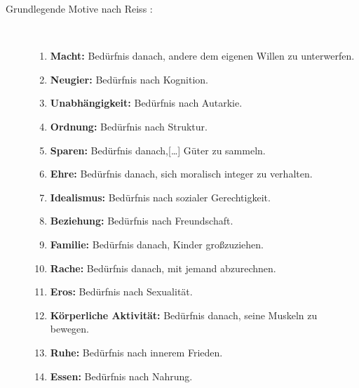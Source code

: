 \documentclass[a4paper,12pt,twoside]{scrartcl}
\begin{document}
\begin{description}
   \item[Grundlegende Motive nach Reiss \cite{Reiss2009}:]~\par
   \begin{enumerate}
      \item \textbf{Macht:} Bedürfnis danach, andere dem eigenen Willen zu unterwerfen.
      \item \textbf{Neugier:} Bedürfnis nach Kognition.
      \item \textbf{Unabhängigkeit:} Bedürfnis nach Autarkie.
      \item \textbf{Ordnung:} Bedürfnis nach Struktur.
      \item \textbf{Sparen:} Bedürfnis danach,[…] Güter zu sammeln.
      \item \textbf{Ehre:} Bedürfnis danach, sich moralisch integer zu verhalten.
      \item \textbf{Idealismus:} Bedürfnis nach sozialer Gerechtigkeit.
      \item \textbf{Beziehung:} Bedürfnis nach Freundschaft.
      \item \textbf{Familie:} Bedürfnis danach, Kinder großzuziehen.
      \item \textbf{Rache:} Bedürfnis danach, mit jemand abzurechnen.
      \item \textbf{Eros:} Bedürfnis nach Sexualität.
      \item \textbf{Körperliche Aktivität:} Bedürfnis danach, seine Muskeln zu bewegen.
      \item \textbf{Ruhe:} Bedürfnis nach innerem Frieden.
      \item \textbf{Essen:} Bedürfnis nach Nahrung.
   \end{enumerate}
\end{description}
\end{document}
